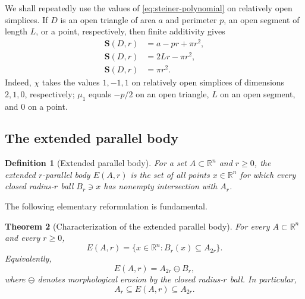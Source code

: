 \documentclass[11pt]{article}
\newtheorem{theorem}{Theorem}[section]
\newtheorem{definition}[theorem]{Definition}
\newcommand{\R}{\mathbb R}
\newcommand{\Steiner}{\mathbf S}
\numberwithin{equation}{section}
\begin{document}
We shall repeatedly use the values of \eqref{eq:steiner-polynomial} on relatively open simplices. If $D$ is an open triangle of area $a$ and perimeter $p$, an open segment of length $L$, or a point, respectively, then finite additivity gives
\begin{align}
\Steiner(D,r)&=a-pr+\pi r^2, \label{eq:S-open-triangle}\\
\Steiner(D,r)&=2Lr-\pi r^2, \label{eq:S-open-edge}\\
\Steiner(D,r)&=\pi r^2. \label{eq:S-point}
\end{align}
Indeed, $\chi$ takes the values $1,-1,1$ on relatively open simplices of dimensions $2,1,0$, respectively; $\mu_1$ equals $-p/2$ on an open triangle, $L$ on an open segment, and $0$ on a point.

\subsection{The extended parallel body}

\begin{definition}[Extended parallel body]\label{def:extended-parallel}
For a set $A\subset\R^n$ and $r\ge0$, the \emph{extended $r$-parallel body} $E(A,r)$ is the set of all points $x\in\R^n$ for which every closed radius-$r$ ball $B_r\ni x$ has nonempty intersection with $A_r$.
\end{definition}

The following elementary reformulation is fundamental.

\begin{theorem}[Characterization of the extended parallel body]\label{thm:erosion-characterization}
For every $A\subset\R^n$ and every $r\ge0$,
\[
\boxed{
E(A,r)=\{x\in\R^n:B_r(x)\subseteq A_{2r}\}.
}
\]
Equivalently,
\[
E(A,r)=A_{2r}\ominus B_r,
\]
where $\ominus$ denotes morphological erosion by the closed radius-$r$ ball. In particular,
\[
A_r\subseteq E(A,r)\subseteq A_{2r}.
\]
\end{theorem}
\end{document}
